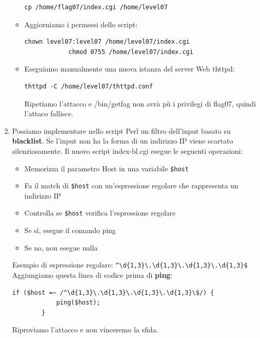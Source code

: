 \begin{enumerate}
\begin{itemize}
        \begin{lstlisting}[style=bashstyle]
            cp /home/flag07/index.cgi /home/level07
        \end{lstlisting}
        \item Aggiorniamo i permessi dello script:
        \begin{lstlisting}[style=bashstyle]
            chown level07:level07 /home/level07/index.cgi
            chmod 0755 /home/level07/index.cgi
        \end{lstlisting}
        \item Eseguiamo manualmente una nuova istanza del server Web thttpd:
        \begin{lstlisting}[style=bashstyle]
            thttpd -C /home/level07/thttpd.conf
        \end{lstlisting} 
        Ripetiamo l'attacco e /bin/getfag non avrà pù i privilegi di flag07, quindi l'attaco fallisce.
    \end{itemize}
    \item Possiamo implementare nello script Perl un filtro dell'input basato su \textbf{blacklist}. Se l'input non ha la forma di un indirizzo IP viene scartato silenziosamente.
    Il nuovo script index-bl.cgi esegue le seguenti operazioni:
    
\begin{itemize}
    \item Memorizza il parametro Host in una variabile \texttt{\$host}
    \item Fa il match di \texttt{\$host} con un'espressione regolare che rappresenta un indirizzo IP
    \item Controlla se \texttt{\$host} verifica l'espressione regolare
    \item Se sì, esegue il comando ping
    \item Se no, non esegue nulla
\end{itemize}
    Esempio di espressione regolare: \verb|^\d{1,3}\.\d{1,3}\.\d{1,3}\.\d{1,3}$|
    Aggiungiamo questa linea di codice prima di \textbf{ping}:
\begin{lstlisting}[style=perlstyle]
        if ($host =~ /^\d{1,3}\.\d{1,3}\.\d{1,3}\.\d{1,3}\$/) { 
            ping($host);
        }
\end{lstlisting}
Riproviamo l’attacco e non vinceremo la sfida.
\end{enumerate}

